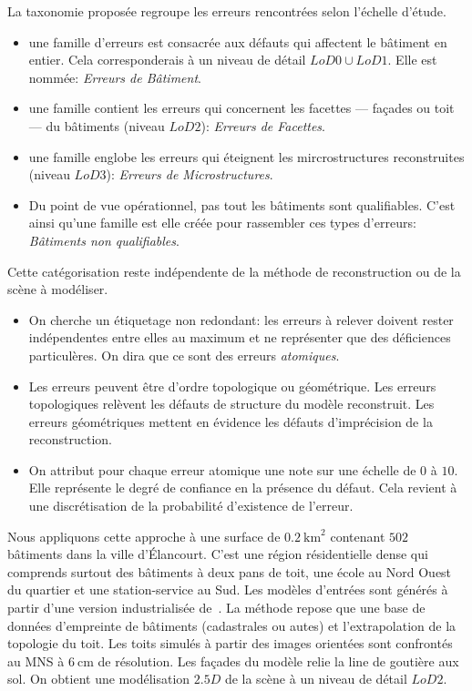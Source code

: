 \documentclass[a4paper,french]{article}
\begin{document}
    La taxonomie proposée regroupe les erreurs rencontrées selon l'échelle d'étude.
    \begin{itemize}
        \item une famille d'erreurs est consacrée aux défauts qui affectent le bâtiment en entier. Cela corresponderais à un niveau de détail $LoD 0\cup LoD 1$. Elle est nommée: \emph{Erreurs de Bâtiment}.
        \item une famille contient les erreurs qui concernent les facettes --- façades ou toit --- du bâtiments (niveau $LoD 2$): \emph{Erreurs de Facettes}.
        \item une famille englobe les erreurs qui éteignent les mircrostructures reconstruites (niveau $LoD 3$): \emph{Erreurs de Microstructures}.
        \item Du point de vue opérationnel, pas tout les bâtiments sont qualifiables. C'est ainsi qu'une famille est elle créée pour rassembler ces types d'erreurs: \emph{Bâtiments non qualifiables}.
    \end{itemize}

    Cette catégorisation reste indépendente de la méthode de reconstruction ou de la scène à modéliser.
    \begin{itemize}
        \item On cherche un étiquetage non redondant: les erreurs à relever doivent rester indépendentes entre elles au maximum et ne représenter que des déficiences particulères. On dira que ce sont des erreurs \emph{atomiques}.
        \item Les erreurs peuvent être d'ordre topologique ou géométrique. Les erreurs topologiques relèvent les défauts de structure du modèle reconstruit. Les erreurs géométriques mettent en évidence les défauts d'imprécision de la reconstruction.
        \item On attribut pour chaque erreur atomique une note sur une échelle de $0$ à $10$. Elle représente le degré de confiance en la présence du défaut. Cela revient à une discrétisation de la probabilité d'existence de l'erreur.
    \end{itemize}

    Nous appliquons cette approche à une surface de $\SI{0.2}{\km \squared}$ contenant $502$ bâtiments dans la ville d'\'Elancourt. C'est une région résidentielle dense qui comprends surtout des bâtiments à deux pans de toit, une école au Nord Ouest du quartier et une station-service au Sud. Les modèles d'entrées sont générés à partir d'une version industrialisée de~\cite{Durupt2006}. La méthode repose que une base de données d'empreinte de bâtiments (cadastrales ou autes) et l'extrapolation de la topologie du toit. Les toits simulés à partir des images orientées sont confrontés au MNS à $\SI{6}{\cm}$ de résolution. Les façades du modèle relie la line de goutière aux sol. On obtient une modélisation $2.5D$ de la scène à un niveau de détail $LoD 2$.
\end{document}
